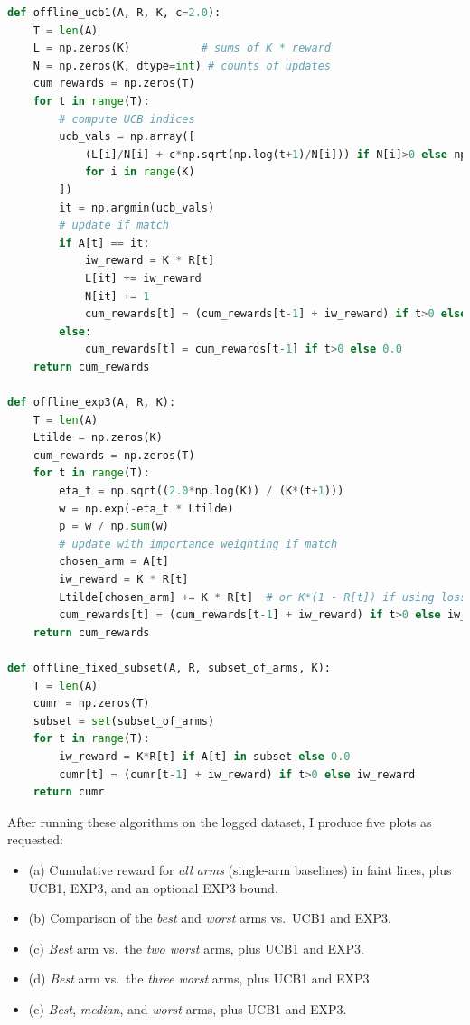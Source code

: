 \begin{lstlisting}[language=Python, caption={Key implementation of Offline UCB1 and Offline EXP3 with importance weighting.}]
def offline_ucb1(A, R, K, c=2.0):
    T = len(A)
    L = np.zeros(K)           # sums of K * reward
    N = np.zeros(K, dtype=int) # counts of updates
    cum_rewards = np.zeros(T)
    for t in range(T):
        # compute UCB indices
        ucb_vals = np.array([
            (L[i]/N[i] + c*np.sqrt(np.log(t+1)/N[i])) if N[i]>0 else np.inf
            for i in range(K)
        ])
        it = np.argmin(ucb_vals)
        # update if match
        if A[t] == it:
            iw_reward = K * R[t]
            L[it] += iw_reward
            N[it] += 1
            cum_rewards[t] = (cum_rewards[t-1] + iw_reward) if t>0 else iw_reward
        else:
            cum_rewards[t] = cum_rewards[t-1] if t>0 else 0.0
    return cum_rewards

def offline_exp3(A, R, K):
    T = len(A)
    Ltilde = np.zeros(K)
    cum_rewards = np.zeros(T)
    for t in range(T):
        eta_t = np.sqrt((2.0*np.log(K)) / (K*(t+1)))
        w = np.exp(-eta_t * Ltilde)
        p = w / np.sum(w)
        # update with importance weighting if match
        chosen_arm = A[t]
        iw_reward = K * R[t]
        Ltilde[chosen_arm] += K * R[t]  # or K*(1 - R[t]) if using loss=1-reward
        cum_rewards[t] = (cum_rewards[t-1] + iw_reward) if t>0 else iw_reward
    return cum_rewards

def offline_fixed_subset(A, R, subset_of_arms, K):
    T = len(A)
    cumr = np.zeros(T)
    subset = set(subset_of_arms)
    for t in range(T):
        iw_reward = K*R[t] if A[t] in subset else 0.0
        cumr[t] = (cumr[t-1] + iw_reward) if t>0 else iw_reward
    return cumr
\end{lstlisting}

After running these algorithms on the logged dataset, I produce five plots as requested:

\begin{itemize}
  \item (a) Cumulative reward for \emph{all arms} (single-arm baselines) in faint lines, plus UCB1, EXP3, and an optional EXP3 bound.
  \item (b) Comparison of the \emph{best} and \emph{worst} arms vs.\ UCB1 and EXP3.
  \item (c) \emph{Best} arm vs.\ the \emph{two worst} arms, plus UCB1 and EXP3.
  \item (d) \emph{Best} arm vs.\ the \emph{three worst} arms, plus UCB1 and EXP3.
  \item (e) \emph{Best}, \emph{median}, and \emph{worst} arms, plus UCB1 and EXP3.
\end{itemize}

